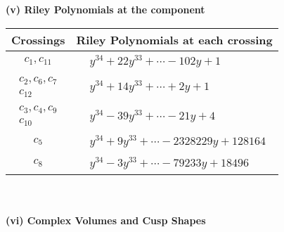 \documentclass[1p]{elsarticle_modified}
\theoremstyle{definition}
\begin{document}
\newpage\renewcommand{\arraystretch}{1}
\flushleft \textbf{(v) Riley Polynomials at the component}\newline \\
\begin{tabular}{m{50pt}|m{274pt}}
Crossings & \hspace{64pt}Riley Polynomials at each crossing \\
\hline $$\begin{aligned}c_{1},c_{11}\end{aligned}$$&$\begin{aligned}
&y^{34}+22 y^{33}+\cdots-102 y+1
\end{aligned}$\\
\hline $$\begin{aligned}c_{2},c_{6},c_{7}\\c_{12}\end{aligned}$$&$\begin{aligned}
&y^{34}+14 y^{33}+\cdots+2 y+1
\end{aligned}$\\
\hline $$\begin{aligned}c_{3},c_{4},c_{9}\\c_{10}\end{aligned}$$&$\begin{aligned}
&y^{34}-39 y^{33}+\cdots-21 y+4
\end{aligned}$\\
\hline $$\begin{aligned}c_{5}\end{aligned}$$&$\begin{aligned}
&y^{34}+9 y^{33}+\cdots-2328229 y+128164
\end{aligned}$\\
\hline $$\begin{aligned}c_{8}\end{aligned}$$&$\begin{aligned}
&y^{34}-3 y^{33}+\cdots-79233 y+18496
\end{aligned}$\\
\hline
\end{tabular}\\~\\
\newpage\flushleft \textbf{(vi) Complex Volumes and Cusp Shapes}
\end{document}
